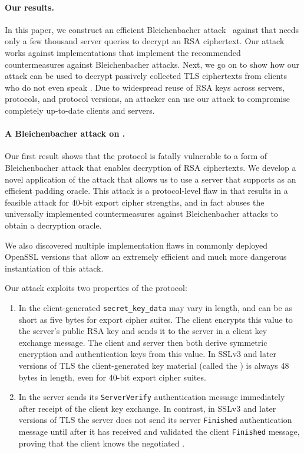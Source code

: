 \paragraph{Our results.}
In this paper, we construct an efficient Bleichenbacher attack~\cite{Bleichenbacher}
against \ssltwo that needs only a few thousand server queries to
decrypt an RSA ciphertext.
Our attack works against implementations that
implement the recommended countermeasures against Bleichenbacher attacks.  Next, we go on to show how
our \ssltwo attack can be used to decrypt passively collected TLS
ciphertexts from clients who do not even speak \ssltwo.  Due to
widespread reuse of RSA keys across servers, protocols, and protocol
versions, an attacker can use our attack to compromise completely
up-to-date clients and servers.
\fi

\paragraph{A Bleichenbacher attack on \ssltwo.}
Our first result shows that the \ssltwo protocol is fatally
vulnerable to a form of Bleichenbacher attack
that enables decryption of RSA
ciphertexts.  We develop a novel application of the
attack that allows us to use a server that supports \ssltwo as an
efficient padding oracle.  This attack is a protocol-level flaw in \ssltwo that
results in a feasible attack for 40-bit export cipher strengths,
and in fact abuses the universally implemented countermeasures against
Bleichenbacher attacks to obtain a decryption oracle.

We also discovered multiple implementation flaws in
commonly deployed OpenSSL versions that allow an extremely efficient
and much more dangerous instantiation of this attack.

Our attack exploits two
properties of the \ssltwo protocol:
\begin{enumerate}
	\item In \ssltwo the
	client-generated \texttt{secret\_key\_data} may vary in
	length, and can be as short as five bytes for export cipher
	suites.  The client encrypts this value to the server's public
	RSA key and sends it to the server in a client key exchange
	message.  The client and server then both derive symmetric
	encryption and authentication keys from this value.  In SSLv3
	and later versions of TLS the client-generated key material
	(called the \pms) is always 48 bytes in length, even for
	40-bit export cipher suites.

        \item In \ssltwo the server
	sends its \texttt{ServerVerify} authentication message
	immediately after receipt of the client key exchange.  In
	contrast, in SSLv3 and later versions of TLS the server does
	not send its server \texttt{Finished} authentication message
	until after it has received and validated the
	client \texttt{Finished} message, proving that the client
	knows the negotiated \pms.
\end{enumerate}

